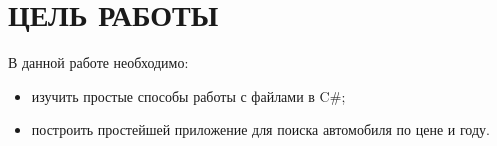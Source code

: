 \section{ЦЕЛЬ РАБОТЫ}

В данной работе необходимо:

\begin{itemize}
  \item изучить простые способы работы с файлами в C\#;
  \item построить простейшей приложение для поиска автомобиля по цене и году.
\end{itemize}

\newpage
